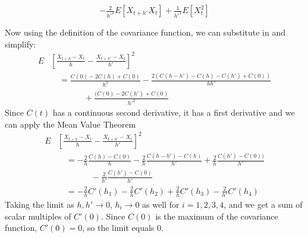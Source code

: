 \documentclass[12pt]{article}
\theoremstyle{plain}
\theoremstyle{definition}
\theoremstyle{remark}
\begin{document}
\begin{enumerate}
\begin{enumerate}
\begin{align*}
          - \frac{2}{h'^2} E\left[X_{t+h'}X_t\right]
          + \frac{1}{h'^2} E\left[X_t^2\right]\\\\
    \end{align*}
    Now using the definition of the covariance function, we can
    substitute in and simplify:
    \begin{align*}
      E&\left[\frac{X_{t+h}-X_t}{h} - \frac{X_{t+h'}-X_t}{h'}\right]^2 \\
        & \quad =
          \frac{C(0) - 2C(h) +C(0)}{h^2}
          -\frac{2 (C(h-h') - C(h) - C(h') +C(0))}{hh'}\\
        &\qquad\qquad
          + \frac{(C(0) -2C(h') + C(0) }{h'^2}
    \end{align*}
    Since $C(t)$ has a continuous second derivative, it has a first
    derivative and we can apply the Mean Value Theorem
    \begin{align*}
      E&\left[\frac{X_{t+h}-X_t}{h} - \frac{X_{t+h'}-X_t}{h'}\right]^2 \\
        & \quad =
          -\frac{2}{h}\frac{C(h) - C(0)}{h}
          -\frac{2}{h} \frac{C(h-h') - C(h)}{h'}
          +\frac{2}{h} \frac{C(h') -C(0))}{h'}\\
        &\qquad\qquad
          -\frac{2}{h'}\frac{C(h') - C(0)}{h'}\\
        & \quad =
          -\frac{2}{h}C'(h_1)
          -\frac{2}{h} C'(h_2)
          +\frac{2}{h} C'(h_3)
          -\frac{2}{h'}C'(h_4)
    \end{align*}
    Taking the limit as $h,h'\rightarrow 0$, $h_i\rightarrow 0$ as well
    for $i=1,2,3,4$, and we get a sum of scalar multiples of $C'(0)$.
    Since $C(0)$ is the maximum of the covariance function, $C'(0)=0$,
    so the limit equals 0.


\end{enumerate}
\end{enumerate}
\end{document}
